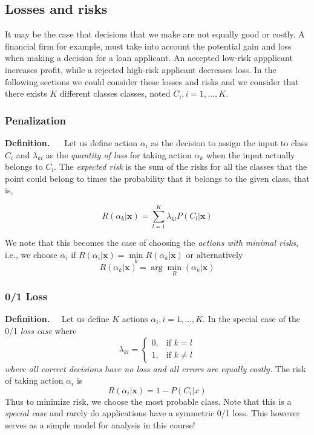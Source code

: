 \documentclass[a4paper,12pt]{article}
\newcommand{\xx}{{\bm x}}
\begin{document}
\subsection{Losses and risks}
It may be the case that decisions that we make are not equally good or costly. A financial firm for example, must take into account the potential gain and loss when making a decision for a loan applicant. An accepted low-risk appplicant increases profit, while a rejected high-risk applicant decreases loss. In the following sections we could consider these losses and risks and we consider that there exists $K$ different classes classes, noted $C_{i}, i = 1,...,K$. 

\subsubsection{Penalization}
\textbf{Definition. $\quad$} Let us define action $\alpha_i$ as the decision to assign the input to class $C_i$ and $\lambda_{kl}$ as the \textit{quantity of loss} for taking action $\alpha_k$ when the input actually belongs to $C_l$. The \textit{expected risk} is the sum of the risks for all the classes that the point could belong to times the probability that it belongs to the given class, that is,

\begin{equation*}
R(\alpha_k|\xx) = \sum_{l = 1}^{K}{\lambda_{kl}P(C_l|\xx)}
\end{equation*}

We note that this becomes the case of choosing the \textit{actions with minimal risks}, i.e., we choose $\alpha_i$ if  $R(\alpha_i|\xx) = \min\limits_k R(\alpha_k|\xx)$ or alternatively
\begin{equation*}
R(\alpha_k|\xx) = \arg \min\limits_ R(\alpha_k|\xx)
\end{equation*}


\subsubsection{0/1 Loss}
\textbf{Definition. $\quad$}Let us define $K$ actions $\alpha_i, i=1,...,K$. In the special case of the 0/1 \textit{loss case} where
\begin{equation*}
\lambda_{kl} =
\begin{cases}
0, & \text{if } k = l\\
1, & \text{if } k \neq l
\end{cases}
\end{equation*}
\textit{where all correct decisions have no loss and all errors are equally costly.} The risk of taking action $\alpha_i$ is
$$ R(\alpha_i|\xx) = 1 - P(C_i|x)$$
Thus to minimize risk, we choose the most probable class. Note that this is a \textit{special case} and rarely do applications have a symmetric 0/1 loss. This however serves as a simple model for analysis in this course!
\end{document}
